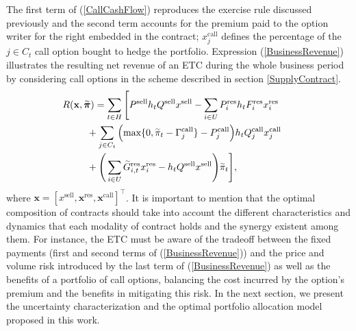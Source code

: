 	The first term of (\ref{CallCashFlow}) reproduces the exercise rule discussed previously and the second term accounts for the premium paid to the option writer for the right embedded in the contract; $x_{j}^{\text{call}}$ defines the percentage of the $j \in C_{t}$ call option bought to hedge the portfolio. Expression (\ref{BusinessRevenue}) illustrates the resulting net revenue of an ETC during the whole business period by considering call options in the scheme described in section \ref{SupplyContract}.
%
\begin{align}
	& \hspace{-0.5cm} R(\mathbf{x}, \accentset{\sim}{\boldsymbol{\pi}}) = \sum_{t \in H} \Bigg[ P^{\text{sell}} h_{t} Q^{\text{sell}} x^{\text{sell}} - \sum_{i \in U} P_{i}^{\text{res}} h_{t} F_{i}^{\text{res}} x_{i}^{\text{res}} \notag \\
	 		& \> \> \> \> \> + \sum_{j \in C_{t}} \Big( \text{max}\{0, \accentset{\sim}{\pi}_{t} - \Gamma_{j}^{\text{call}}\} - P_{j}^{\text{call}} \Big) h_{t} Q_{j}^{\text{call}} x_{j}^{\text{call}} \notag \\
			& \> \> \> \> \> + \Bigg( \sum_{i \in U} \accentset{\sim}{G}_{i,t}^{\text{res}} x_{i}^{\text{res}} - h_{t} Q^{\text{sell}} x^{\text{sell}} \Bigg) \accentset{\sim}{\pi}_{t} \Bigg], \label{BusinessRevenue}
\end{align}
%
where $\mathbf{x} = [x^{\text{sell}}, \boldsymbol{x}^{\text{res}}, \boldsymbol{x}^{\text{call}}]^{\top}$. It is important to mention that the optimal composition of contracts should take into account the different characteristics and dynamics that each modality of contract holds and the synergy existent among them. For instance, the ETC must be aware of the tradeoff between the fixed payments (first and second terms of (\ref{BusinessRevenue})) and the price and volume risk introduced by the last term of (\ref{BusinessRevenue}) as well as the benefits of a portfolio of call options, balancing the cost incurred by the option's premium and the benefits in mitigating this risk. In the next section, we present the uncertainty characterization and the optimal portfolio allocation model proposed in this work.
